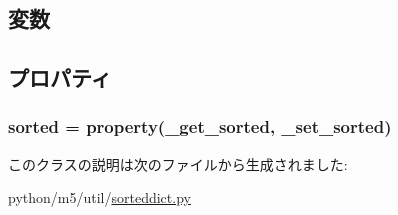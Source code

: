 \subsection{変数}
\hypertarget{classm5_1_1util_1_1sorteddict_1_1SortedDict_adf902ff1a2e676ffc53c792f0ee4ff06}{
\subsubsection[{\_\-sorted}]{}}
\label{classm5_1_1util_1_1sorteddict_1_1SortedDict_adf902ff1a2e676ffc53c792f0ee4ff06}
\hypertarget{classm5_1_1util_1_1sorteddict_1_1SortedDict_aa31cdc0ed3041a75679ebf1ea5661b84}{
\subsubsection[{\_\-sorted\_\-keys}]{}}
\label{classm5_1_1util_1_1sorteddict_1_1SortedDict_aa31cdc0ed3041a75679ebf1ea5661b84}


\subsection{プロパティ}
\hypertarget{classm5_1_1util_1_1sorteddict_1_1SortedDict_a4d28f6e51bf13f49077122951121dfc5}{
\subsubsection[{sorted}]{\setlength{\rightskip}{0pt plus 5cm}sorted = property(\_\-get\_\-sorted, \_\-set\_\-sorted)}}
\label{classm5_1_1util_1_1sorteddict_1_1SortedDict_a4d28f6e51bf13f49077122951121dfc5}


このクラスの説明は次のファイルから生成されました:\begin{DoxyCompactItemize}
\item 
python/m5/util/\hyperlink{sorteddict_8py}{sorteddict.py}\end{DoxyCompactItemize}
